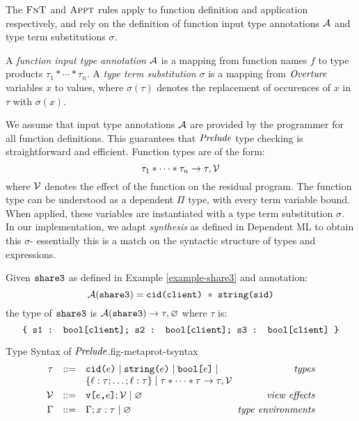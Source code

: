 The $\text{\sc FnT}$ and $\text{\sc Appt}$ rules apply to function
definition and application respectively, and rely on the
definition of function input type annotations $\mathcal{A}$ and
type term substitutions $\sigma$. 
\begin{definition}
  A \emph{function input type annotation} $\mathcal{A}$ is a mapping from
  function names $f$ to type products $\tau_1 * \cdots * \tau_n$.
  A \emph{type term substitution} $\sigma$ is a mapping from
  $\mathit{Overture}$ variables $x$ to values, where $\sigma(\tau)$ denotes
  the replacement of occurences of $x$ in $\tau$ with $\sigma(x)$. 
\end{definition}
We assume that input type annotations $\mathcal{A}$ are provided by the
programmer for all function definitions. This guarantees that
$\mathit{Prelude}$ type checking is straightforward and efficient.
Function types are of the form:
$$
\tau_1 * \cdots * \tau_n \rightarrow \tau,\mathcal{V}
$$
where $\mathcal{V}$ denotes the effect of the function on the residual
program.  The function type can be understood as a dependent $\Pi$
type, with every term variable bound. When applied, these variables
are instantiated with a type term substitution $\sigma$. In our
implementation, we adapt \emph{synthesis} as defined in Dependent ML \cite{10.1145/292540.292560}
to obtain this $\sigma$- essentially this is a match on the syntactic
structure of types and expressions. 
\begin{example}
  Given $\texttt{share3}$ as defined in Example \ref{example-share3} and
  annotation:
  $$\tas(\ttt{share3}) =  \ttt{cid(client)}\ *\ \ttt{string(sid)}$$
  the type of $\texttt{share3}$ is $\mathcal{A}(\texttt{share3}) \rightarrow \tau,\varnothing$
  where $\tau$ is:
  $$
  \texttt{\{ s1 : bool[client]; s2 : bool[client]; s3 : bool[client] \}}
  $$
\end{example}

\begin{fpfig}[t]{Type Syntax of $\mathit{Prelude}$.}{fig-metaprot-tsyntax}
$$
\begin{array}{rcl@{\hspace{2mm}}r}
\srct &::=& \cidty{e} \mid \stringty{e} \mid \bet{e} \mid  & \gdesc{types}\\ 
 &&  \{ \flab : \srct;\ldots;\flab : \srct \} \mid \tau * \cdots * \tau \rightarrow \tau,\viewst \\[1mm]
\viewst  &::=& \view{e}{e};\viewst \mid \varnothing   & \gdesc{view effects}\\[1mm]
\Gamma &::=& \Gamma; x : \tau \mid \varnothing & \gdesc{type environments}    
\end{array}
$$
\end{fpfig}

